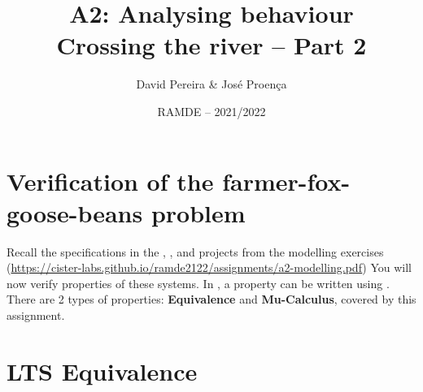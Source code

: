 \documentclass[11pt]{article}
\date{RAMDE -- 2021/2022}
\begin{document}
 
 
\title{A2: Analysing behaviour\\
{\Large Crossing the river -- Part 2}}

\author{David Pereira \& Jos\'{e} Proen\c{c}a} 


\maketitle





\section*{Verification of the farmer-fox-goose-beans problem}

Recall the specifications in the , , and  projects from the modelling exercises (\url{https://cister-labs.github.io/ramde2122/assignments/a2-modelling.pdf})
You will now verify properties of these systems.
In , a property can be written using .
There are 2 types of properties: \textbf{Equivalence} and \textbf{Mu-Calculus}, covered by this assignment.

\section*{LTS Equivalence}
\end{document}
